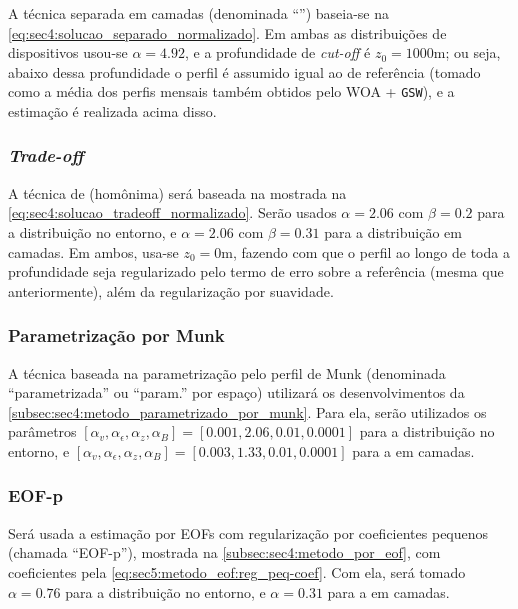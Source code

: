 \subsubsection*{}

A técnica separada em camadas (denominada ``'') baseia-se na \cref{eq:sec4:solucao_separado_normalizado}. Em ambas as distribuições de dispositivos usou-se $\alpha = 4.92$, e a profundidade de \textit{cut-off} é $z_0 = 1000\si{\meter}$; ou seja, abaixo dessa profundidade o perfil é assumido igual ao de referência (tomado como a média dos perfis mensais também obtidos pelo WOA + \texttt{GSW}), e a estimação é realizada acima disso.

\subsubsection*{\textsl{Trade-off}}

A técnica de  (homônima) será baseada na mostrada na \cref{eq:sec4:solucao_tradeoff_normalizado}. Serão usados $\alpha = 2.06$ com $\beta = 0.2$ para a distribuição no entorno, e $\alpha = 2.06$ com $\beta = 0.31$ para a distribuição em camadas. Em ambos, usa-se $z_0 = 0\si{\meter}$, fazendo com que o perfil ao longo de toda a profundidade seja regularizado pelo termo de erro sobre a referência (mesma que anteriormente), além da regularização por suavidade.

\subsubsection*{Parametrização por Munk}

A técnica baseada na parametrização pelo perfil de Munk (denominada ``parametrizada'' ou ``param.'' por espaço) utilizará os desenvolvimentos da \cref{subsec:sec4:metodo_parametrizado_por_munk}. Para ela, serão utilizados os parâmetros $[\alpha_v,\alpha_{\epsilon},\alpha_z,\alpha_B] = [0.001, 2.06, 0.01, 0.0001]$ para a distribuição no entorno, e $[\alpha_v,\alpha_{\epsilon},\alpha_z,\alpha_B] = [0.003, 1.33, 0.01, 0.0001]$ para a em camadas.

\subsubsection*{EOF-p}

Será usada a estimação por EOFs com regularização por coeficientes pequenos (chamada ``EOF-p''), mostrada na \cref{subsec:sec4:metodo_por_eof}, com coeficientes pela \cref{eq:sec5:metodo_eof:reg_peq-coef}. Com ela, será tomado $\alpha = 0.76$ para a distribuição no entorno, e $\alpha = 0.31$ para a em camadas.

